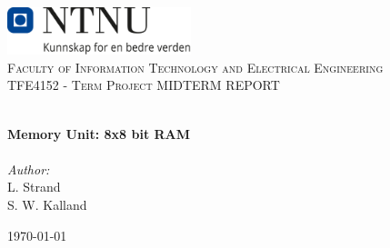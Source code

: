 
\begin{titlepage}
\vbox{ }
\vbox{ }
\begin{center}
\includegraphics[width=0.40\textwidth]{LaTeX/Images/NTNU_logo.png}\\[1cm]
\textsc{\LARGE Faculty of Information Technology and Electrical Engineering} \\[1.5cm]
\textsc{\Large TFE4152 - Term Project MIDTERM REPORT}\\[0.5cm]
\vbox{ }

\HRule \\[0.4cm]
{ \huge \bfseries Memory Unit: 8x8 bit RAM}\\[0.4cm]
\HRule \\[1.5cm]

\large
\emph{Author:}\\[0.5cm]
L. Strand   \\
S. W. Kalland
\vfill

{\large \today}
\end{center}
\end{titlepage}